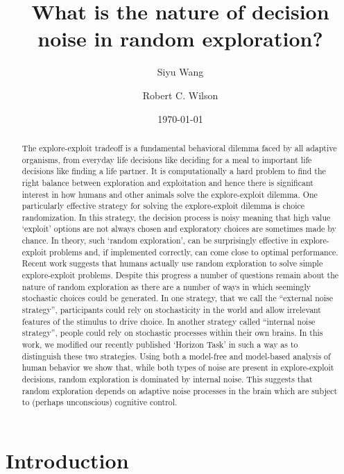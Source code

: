 \documentclass[12pt]{article}
\title{What is the nature of decision noise in random exploration?}
\author[1]{Siyu Wang}
\author[1,2]{Robert C. Wilson}
\affil[1]{Department of Psychology, University of Arizona, Tucson AZ USA}
\affil[2]{Cognitive Science Program, University of Arizona, Tucson AZ USA}
\date{\today}
\begin{document}
	\maketitle
	
	\newpage
	\begin{abstract}
		The explore-exploit tradeoff is a fundamental behavioral dilemma faced by all adaptive organisms, from everyday life decisions like deciding for a meal to important life decisions like finding a life partner. It is computationally a hard problem to find the right balance between exploration and exploitation and hence there is significant interest in how humans and other animals solve the explore-exploit dilemma. One particularly effective strategy for solving the explore-exploit dilemma is choice randomization.  In this strategy, the decision process is noisy meaning that high value `exploit' options are not always chosen and exploratory choices are sometimes made by chance. In theory, such `random exploration', can be surprisingly effective in explore-exploit problems and, if implemented correctly, can come close to optimal performance. Recent work suggests that humans actually use random exploration to solve simple explore-exploit problems. Despite this progress a number of questions remain about the nature of random exploration as there are a number of ways in which seemingly stochastic choices could be generated. In one strategy, that we call the “external noise strategy”, participants could rely on stochasticity in the world and allow irrelevant features of the stimulus to drive choice. In another strategy called “internal noise strategy”, people could rely on stochastic processes within their own brains. In this work, we modified our recently published `Horizon Task' in such a way as to distinguish these two strategies. Using both a model-free and model-based analysis of human behavior we show that, while both types of noise are present in explore-exploit decisions, random exploration is dominated by internal noise. This suggests that random exploration depends on adaptive noise processes in the brain which are subject to (perhaps unconscious) cognitive control. 
	\end{abstract}
	\newpage
	
	
	\section*{Introduction}
	
\end{document}
